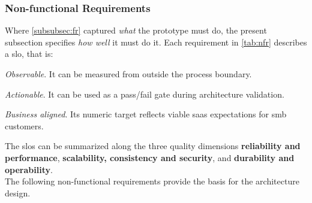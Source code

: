\documentclass[11pt, a4paper, oneside, listof=totoc]{scrartcl}
\begin{document}
            \subsubsection{Non-functional Requirements}\label{subsubsec:nfr}

                Where \autoref{subsubsec:fr} captured \textit{what} the prototype must do, the
                present subsection specifies \textit{how well} it must do it.
                Each requirement in \autoref{tab:nfr} describes a \gls{slo}, that is:

                \begin{enumerate}[label={[\arabic*]:},
                    ref=Challenge~\arabic*,
                    leftmargin=*,
                    itemsep=0.6\baselineskip]

                    \item\label{chal:observable}
                        \textit{Observable}.
                        It can be measured from outside the process boundary.

                    \item\label{chal:actionable}
                        \textit{Actionable}.
                        It can be used as a pass/fail gate during architecture validation.

                    \item\label{chal:businessAligned}
                        \textit{Business aligned}.
                        Its numeric target reflects viable \gls{saas} expectations for \gls{smb}
                        customers.

            \end{enumerate}

            The \glspl{slo} can be summarized along the three quality dimensions
            \textbf{reliability and performance}, \textbf{scalability, consistency and security},
            and \textbf{durability and operability}.
            \\
            The following non-functional requirements provide the basis for the architecture design.
\end{document}
